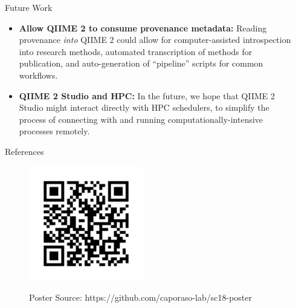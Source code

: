 \documentclass[final]{beamer}
\newlength{\sepwidth}
\newlength{\colwidth}
\newcommand{\separatorcolumn}{\begin{column}{\sepwidth}\end{column}}
\begin{document}
\begin{frame}[t]
\begin{columns}[t]
\begin{column}{\colwidth}
\begin{block}{Future Work}
    \begin{itemize}
      \item \textbf{Allow QIIME 2 to consume provenance metadata:} Reading
      provenance \textit{into} QIIME 2 could allow for computer-assisted
      introspection into research methods, automated transcription of methods
      for publication, and auto-generation of “pipeline” scripts for common workflows.
      \item \textbf{QIIME 2 Studio and HPC:} In the future, we hope that QIIME 2 Studio might interact
      directly with HPC schedulers, to simplify the process of connecting with
      and running computationally-intensive processes remotely.
    \end{itemize}

  \end{block}

  \begin{block}{References}

    \nocite{*}
    

  \end{block}

  \begin{figure}
    \begin{minipage}[c]{\textwidth}
      \hfill
      \includegraphics[height=5cm]{assets/repo}
    \end{minipage}
    \begin{minipage}[c]{\textwidth}
      \hfill
      Poster Source: https://github.com/caporaso-lab/sc18-poster
    \end{minipage}
\end{figure}


\end{column}

\separatorcolumn
\end{columns}
\end{frame}
\end{document}
